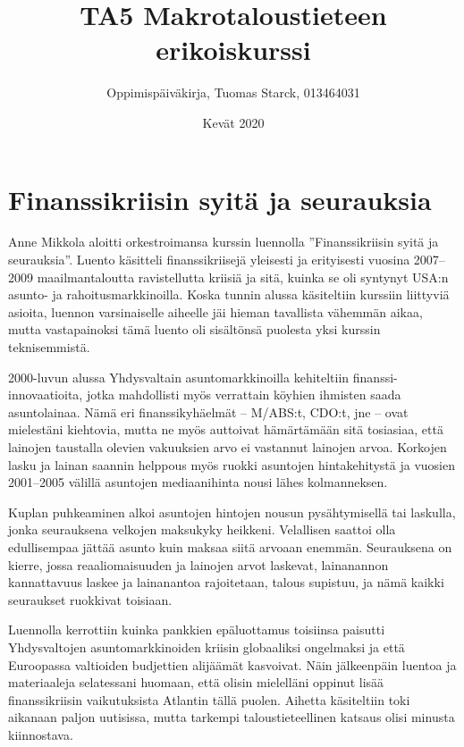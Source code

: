 \documentclass[12pt]{article}
\begin{document}
\title{TA5 Makrotaloustieteen erikoiskurssi}
\author{Oppimispäiväkirja, Tuomas Starck, 013464031}
\date{Kevät 2020}
\maketitle

\newpage
\section{Finanssikriisin syitä ja seurauksia}

Anne Mikkola aloitti orkestroimansa kurssin luennolla ''Finanssikriisin syitä
ja seurauksia''. Luento käsitteli finanssikriisejä yleisesti ja erityisesti
vuosina 2007–2009 maailmantaloutta ravistellutta kriisiä ja sitä, kuinka se oli
syntynyt USA:n asunto- ja rahoitusmarkkinoilla. Koska tunnin alussa käsiteltiin
kurssiin liittyviä asioita, luennon varsinaiselle aiheelle jäi hieman
tavallista vähemmän aikaa, mutta vastapainoksi tämä luento oli sisältönsä
puolesta yksi kurssin teknisemmistä.

2000-luvun alussa Yhdysvaltain asuntomarkkinoilla kehiteltiin
finanssi-innovaatioita, jotka mahdollisti myös verrattain köyhien ihmisten
saada asuntolainaa. Nämä eri finanssikyhäelmät – M/ABS:t, CDO:t, jne – ovat
mielestäni kiehtovia, mutta ne myös auttoivat hämärtämään sitä tosiasiaa, että
lainojen taustalla olevien vakuuksien arvo ei vastannut lainojen arvoa.
Korkojen lasku ja lainan saannin helppous myös ruokki asuntojen hintakehitystä
ja vuosien 2001–2005 välillä asuntojen mediaanihinta nousi lähes kolmanneksen.

Kuplan puhkeaminen alkoi asuntojen hintojen nousun pysähtymisellä tai laskulla,
jonka seurauksena velkojen maksukyky heikkeni. Velallisen saattoi olla
edullisempaa jättää asunto kuin maksaa siitä arvoaan enemmän. Seurauksena on
kierre, jossa reaaliomaisuuden ja lainojen arvot laskevat, lainanannon
kannattavuus laskee ja lainanantoa rajoitetaan, talous supistuu, ja nämä kaikki
seuraukset ruokkivat toisiaan.

Luennolla kerrottiin kuinka pankkien epäluottamus toisiinsa paisutti
Yhdysvaltojen asuntomarkkinoiden kriisin globaaliksi ongelmaksi ja että
Euroopassa valtioiden budjettien alijäämät kasvoivat. Näin jälkeenpäin luentoa
ja materiaaleja selatessani huomaan, että olisin mielelläni oppinut lisää
finanssikriisin vaikutuksista Atlantin tällä puolen. Aihetta käsiteltiin toki
aikanaan paljon uutisissa, mutta tarkempi taloustieteellinen katsaus olisi
minusta kiinnostava.
\end{document}
